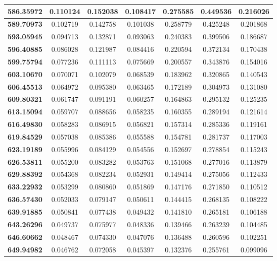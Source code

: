 \documentclass[11pt]{article}
\begin{document}
\begin{appendices}
\begin{longtable}{|c|c|c|c|c|c|c|}
	\textbf{586.35972} & 0.110124 & 0.152038 & 0.108417 & 0.275585 & 0.449536 & 0.216026 \\ \hline
	\textbf{589.70973} & 0.102719 & 0.142758 & 0.101038 & 0.258779 & 0.425248 & 0.201868 \\ \hline
	\textbf{593.05945} & 0.094713 & 0.132871 & 0.093063 & 0.240383 & 0.399506 & 0.186687 \\ \hline
	\textbf{596.40885} & 0.086028 & 0.121987 & 0.084416 & 0.220594 & 0.372134 & 0.170438 \\ \hline
	\textbf{599.75794} & 0.077236 & 0.111113 & 0.075669 & 0.200557 & 0.343876 & 0.154016 \\ \hline
	\textbf{603.10670} & 0.070071 & 0.102079 & 0.068539 & 0.183962 & 0.320865 & 0.140543 \\ \hline
	\textbf{606.45513} & 0.064972 & 0.095380 & 0.063465 & 0.172189 & 0.304973 & 0.131080 \\ \hline
	\textbf{609.80321} & 0.061747 & 0.091191 & 0.060257 & 0.164863 & 0.295132 & 0.125235 \\ \hline
	\textbf{613.15094} & 0.059707 & 0.088656 & 0.058235 & 0.160355 & 0.289194 & 0.121614 \\ \hline
	\textbf{616.49830} & 0.058283 & 0.086915 & 0.056821 & 0.157314 & 0.285336 & 0.119161 \\ \hline
	\textbf{619.84529} & 0.057038 & 0.085386 & 0.055588 & 0.154781 & 0.281737 & 0.117003 \\ \hline
	\textbf{623.19189} & 0.055996 & 0.084129 & 0.054556 & 0.152697 & 0.278854 & 0.115243 \\ \hline
	\textbf{626.53811} & 0.055200 & 0.083282 & 0.053763 & 0.151068 & 0.277016 & 0.113879 \\ \hline
	\textbf{629.88392} & 0.054368 & 0.082234 & 0.052931 & 0.149414 & 0.275056 & 0.112433 \\ \hline
	\textbf{633.22932} & 0.053299 & 0.080860 & 0.051869 & 0.147176 & 0.271850 & 0.110512 \\ \hline
	\textbf{636.57430} & 0.052033 & 0.079147 & 0.050611 & 0.144415 & 0.268135 & 0.108222 \\ \hline
	\textbf{639.91885} & 0.050841 & 0.077438 & 0.049432 & 0.141810 & 0.265181 & 0.106188 \\ \hline
	\textbf{643.26296} & 0.049737 & 0.075977 & 0.048336 & 0.139466 & 0.263239 & 0.104485 \\ \hline
	\textbf{646.60662} & 0.048467 & 0.074330 & 0.047076 & 0.136488 & 0.260596 & 0.102251 \\ \hline
	\textbf{649.94982} & 0.046762 & 0.072058 & 0.045397 & 0.132376 & 0.255761 & 0.099096 \\ \hline

\end{longtable}
\end{appendices}
\end{document}
